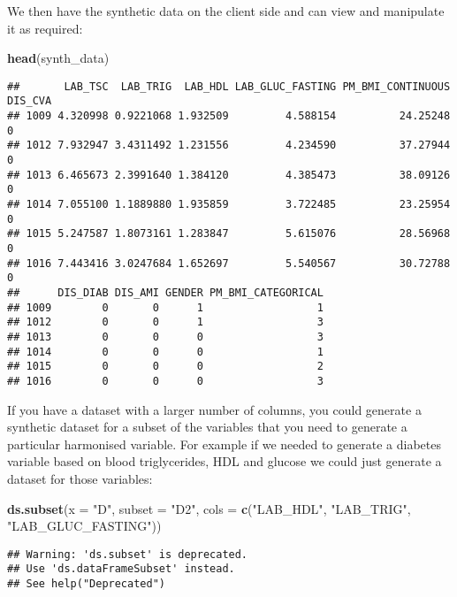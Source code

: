 \documentclass[
]{book}
\newenvironment{Shaded}{\begin{snugshade}}{\end{snugshade}}
\newcommand{\DataTypeTok}[1]{\textcolor[rgb]{0.13,0.29,0.53}{#1}}
\newcommand{\KeywordTok}[1]{\textcolor[rgb]{0.13,0.29,0.53}{\textbf{#1}}}
\newcommand{\NormalTok}[1]{#1}
\newcommand{\StringTok}[1]{\textcolor[rgb]{0.31,0.60,0.02}{#1}}
\begin{document}
We then have the synthetic data on the client side and can view and manipulate it as required:

\begin{Shaded}
\begin{Highlighting}[]
\KeywordTok{head}\NormalTok{(synth_data)}
\end{Highlighting}
\end{Shaded}

\begin{verbatim}
##       LAB_TSC  LAB_TRIG  LAB_HDL LAB_GLUC_FASTING PM_BMI_CONTINUOUS DIS_CVA
## 1009 4.320998 0.9221068 1.932509         4.588154          24.25248       0
## 1012 7.932947 3.4311492 1.231556         4.234590          37.27944       0
## 1013 6.465673 2.3991640 1.384120         4.385473          38.09126       0
## 1014 7.055100 1.1889880 1.935859         3.722485          23.25954       0
## 1015 5.247587 1.8073161 1.283847         5.615076          28.56968       0
## 1016 7.443416 3.0247684 1.652697         5.540567          30.72788       0
##      DIS_DIAB DIS_AMI GENDER PM_BMI_CATEGORICAL
## 1009        0       0      1                  1
## 1012        0       0      1                  3
## 1013        0       0      0                  3
## 1014        0       0      0                  1
## 1015        0       0      0                  2
## 1016        0       0      0                  3
\end{verbatim}

If you have a dataset with a larger number of columns, you could generate a synthetic dataset for a subset of the variables that you need to generate a particular harmonised variable. For example if we needed to generate a diabetes variable based on blood triglycerides, HDL and glucose we could just generate a dataset for those variables:

\begin{Shaded}
\begin{Highlighting}[]
\KeywordTok{ds.subset}\NormalTok{(}\DataTypeTok{x =} \StringTok{"D"}\NormalTok{, }\DataTypeTok{subset =} \StringTok{"D2"}\NormalTok{, }\DataTypeTok{cols =} \KeywordTok{c}\NormalTok{(}\StringTok{"LAB_HDL"}\NormalTok{, }\StringTok{"LAB_TRIG"}\NormalTok{, }\StringTok{"LAB_GLUC_FASTING"}\NormalTok{))}
\end{Highlighting}
\end{Shaded}

\begin{verbatim}
## Warning: 'ds.subset' is deprecated.
## Use 'ds.dataFrameSubset' instead.
## See help("Deprecated")
\end{verbatim}
\end{document}
